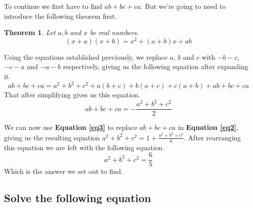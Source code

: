 \documentclass{article}
\newcounter{theoremcounter}
\theoremstyle{maintheorem}
\newtheorem{theorem}[theoremcounter]{\textcolor{SubColor}{Theorem}}
\renewcommand{\eqref}[1]{\textcolor{SubSubColor}{\textbf{Equation \ref{#1}}}}
\begin{document}
To continue we first have to find $ab + bc + ca$.
But we're going to need to introduce the following theorem first.
\begin{theorem}\label{thm4}
	Let $a, b$ and $x$ be real numbers.
	\[ (x + a)(x + b) = x^2 + (a + b)x + ab \]
\end{theorem}
Using the equations established previously, we replace $a$, $b$ and $c$ with $-b-c$, $-c-a$ and $-a-b$ respectively,
giving us the following equation after expanding it.
\[ ab + bc + ca = a^2 + b^2 + c^2 + a(b + c) + b(a + c) + c(a + b) + ab + bc + ca \]
That after simplifying gives us this equation.
\begin{equation}\label{eq3}
	ab + bc + ca = -\frac{a^2 + b^2 + c^2}{2}
\end{equation}

We can now use \eqref{eq3} to replace $ab + bc + ca$ in \eqref{eq2}, giving us the resulting equation $ a^2 + b^2 + c^2 = 1 + \frac{a^2 + b^2 + c^2}{6}$.
After rearranging this equation we are left with the following equation.
\[ a^2 + b^2 + c^2 = \frac{6}{5} \]
Which is the answer we set out to find.

\subsection{
	\normalfont
	Solve the following equation
}
\end{document}
